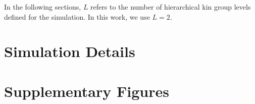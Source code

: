 

\clearpage
\dissertationexclude{\onecolumn}



\clearpage
\dissertationexclude{\twocolumn}






% 


In the following sections, $L$ refers to the number of hierarchical kin group levels defined for the simulation.
In this work, we use $L=2$.






\section{Simulation Details}
\label{sec:simulation-details}


















% 


\section{Supplementary Figures}

